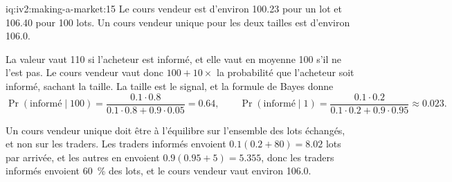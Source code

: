 \begin{solution}{iq:iv2:making-a-market:15}
Le cours vendeur est d'environ 100.23 pour un lot et 106.40 pour 100 lots. Un cours vendeur unique pour les deux tailles est d'environ 106.0.

La valeur vaut 110 si l'acheteur est informé, et elle vaut en moyenne 100 s'il ne l'est pas. Le cours vendeur vaut donc $100 + 10 \times$ la probabilité que l'acheteur soit informé, sachant la taille. La taille est le signal, et la formule de Bayes donne
\[
\Pr(\text{informé} \mid 100) = \frac{0.1 \cdot 0.8}{0.1 \cdot 0.8 + 0.9 \cdot 0.05} = 0.64, \qquad
\Pr(\text{informé} \mid 1) = \frac{0.1 \cdot 0.2}{0.1 \cdot 0.2 + 0.9 \cdot 0.95} \approx 0.023.
\]

Un cours vendeur unique doit être à l'équilibre sur l'ensemble des lots échangés, et non sur les traders. Les traders informés envoient $0.1(0.2 + 80) = 8.02$ lots par arrivée, et les autres en envoient $0.9(0.95 + 5) = 5.355$, donc les traders informés envoient 60~\% des lots, et le cours vendeur vaut environ 106.0.

\end{solution}

